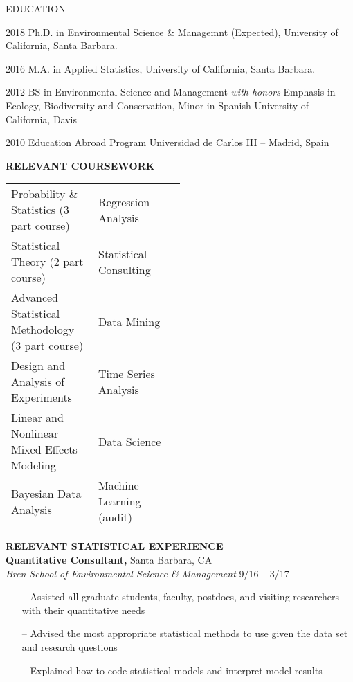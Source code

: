 \begin{vitae}

\begin{vitaesection}{\uppercase{Education}}
\vspace{-0.1cm}
\item [2018]	Ph.D. in Environmental Science \& Managemnt (Expected), University of California, Santa Barbara.
\item [2016]	M.A. in Applied Statistics, University of California, Santa Barbara.
\item [2012] 	BS in Environmental Science and Management \textit{with honors} Emphasis in Ecology, Biodiversity and Conservation, Minor in Spanish 
University of California, Davis 
\item  [2010] Education Abroad Program Universidad de Carlos III – Madrid, Spain
\end{vitaesection}

\textbf{\uppercase{Relevant Coursework}}
\begin{tabular}{l p{0.5\linewidth}}
Probability \& Statistics (3 part course) & Regression Analysis \\
Statistical Theory (2 part course) & Statistical Consulting \\
Advanced Statistical Methodology (3 part course) & Data Mining \\
Design and Analysis of Experiments & Time Series Analysis \\
Linear and Nonlinear Mixed Effects Modeling & Data Science \\
Bayesian Data Analysis & Machine Learning (audit) \\
\end{tabular}

\textbf{\uppercase{Relevant Statistical Experience}} \\
\textbf{Quantitative Consultant,} Santa Barbara, CA \\
\textit{Bren School of Environmental Science \& Management}
\hfill
9/16 – 3/17
\vspace{-\topsep}
\begin{itemize}
\setlength{\parskip}{0pt}
 \setlength{\itemsep}{0pt plus 1pt}
\item[--] Assisted all graduate students, faculty, postdocs, and visiting researchers with their quantitative needs 
\item[--] Advised the most appropriate statistical methods to use given the data set and research questions 
\item[--] Explained how to code statistical models and interpret model results
\end{itemize}
\vspace{-\topsep}


\end{vitae}
